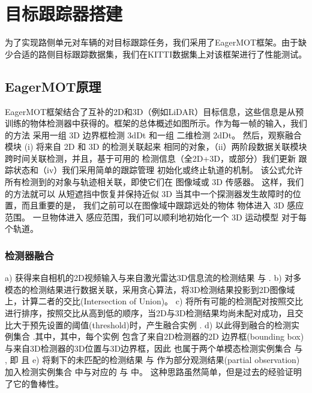 \newpage
{}
\section{目标跟踪器搭建}

为了实现路侧单元对车辆的对目标跟踪任务，我们采用了EagerMOT框架。由于缺少合适的路侧目标跟踪数据集，我们在KITTI数据集上对该框架进行了性能测试。

\subsection{EagerMOT原理}

EagerMOT框架结合了互补的2D和3D（例如LiDAR）目标信息，这些信息是从预训练的物体检测器中获得的。框架的总体概述如图所示。作为每一帧的输入，我们的方法
采用一组 3D 边界框检测 3dDt 和一组
二维检测 2dDt。 然后，观察融合模块
(i) 将来自 2D 和 3D 的检测关联起来
相同的对象，（ii）两阶段数据关联模块
跨时间关联检测，并且，基于可用的
检测信息（全2D+3D，或部分）我们更新
跟踪状态和（iv）我们采用简单的跟踪管理
初始化或终止轨道的机制。
该公式允许所有检测到的对象与轨迹相关联，即使它们在
图像域或 3D 传感器。 这样，我们的方法就可以
从短遮挡中恢复并保持近似 3D
当其中一个探测器发生故障时的位置，而且重要的是，
我们之前可以在图像域中跟踪远处的物体
物体进入 3D 感应范围。 一旦物体进入
感应范围，我们可以顺利地初始化一个 3D 运动模型
对于每个轨道。

\subsubsection{检测器融合}

a) 获得来自相机的2D视频输入与来自激光雷达3D信息流的检测结果 与 .
b) 对多模态的检测结果进行数据关联，采用贪心算法，将3D检测结果投影到2D图像域上，计算二者的交比(Intersection of Union)。
c) 将所有可能的检测配对按照交比进行排序，按照交比从高到低的顺序，当2D与3D检测结果均尚未配对成功，且交比大于预先设置的阈值(threshold)时，产生融合实例 .
d) 以此得到融合的检测实例集合 .其中，其中，每个实例 包含了来自2D检测器的2D 边界框(bounding box)与来自3D检测器的3D位置与3D边界框，因此 也属于两个单模态检测实例集合 与 , 即 且 
e) 将剩下的未匹配的检测结果 与 作为部分观测结果(partial observation)加入检测实例集合 中与对应的 与 中。
这种思路虽然简单，但是过去的经验证明了它的鲁棒性。
